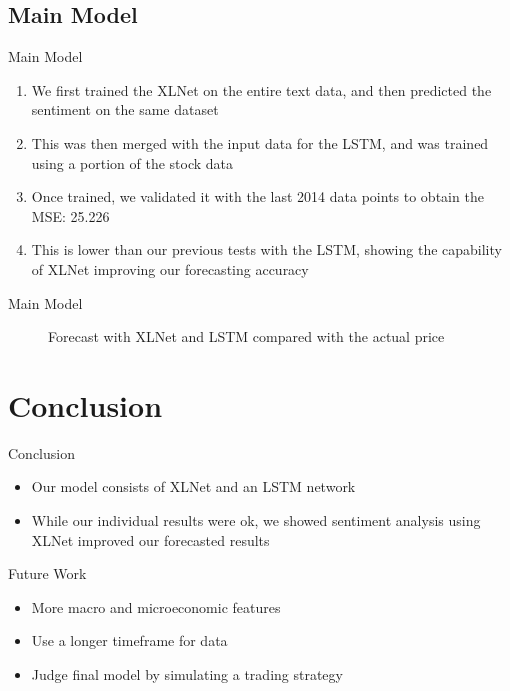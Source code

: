 \documentclass[14pt,aspectratio=169]{beamer}
\newcommand{\CC}{Conclusion}
\newcommand{\MM}{Main Model}
\begin{document}
\subsection{\MM}
\begin{frame}{\MM}
    \begin{enumerate}
        \item We first trained the XLNet on the entire text data, and then predicted the sentiment on the same dataset \\
        \item This was then merged with the input data for the LSTM, and was trained using a portion of the stock data \\
        \item Once trained, we validated it with the last 2014 data points to obtain the MSE: 25.226 \\
        \item This is lower than our previous tests with the LSTM, showing the capability of XLNet improving our forecasting accuracy \\
    \end{enumerate}
\end{frame}

\begin{frame}{\MM}
    \begin{figure}
        \centering
        \scalebox{0.38}{}
        \caption{Forecast with XLNet and LSTM compared with the actual price}
        \label{fig:XLNetLSTMForcast}
\end{figure}
\end{frame}

\section{\CC}
\begin{frame}{\CC}
    \begin{itemize}
        \item Our model consists of XLNet and an LSTM network
        \item While our individual results were ok, we showed sentiment analysis using XLNet improved our forecasted results
    \end{itemize}
\end{frame}

\begin{frame}{Future Work}
    \begin{itemize}
        \item More macro and microeconomic features
        \item Use a longer timeframe for data
        \item Judge final model by simulating a trading strategy
    \end{itemize}
\end{frame}{}
\end{document}
